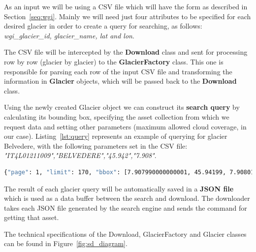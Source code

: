 \documentclass[12pt, a4paper]{report}
\begin{document}
	\par As an input we will be using a CSV file which will have the form as described in Section~\ref{seq:wgi}. Mainly we will need just four attributes to be specified for each desired glacier in order to create a query for searching, as follows: \textit{wgi\_glacier\_id, glacier\_name, lat and lon}.
	
	\par The CSV file will be intercepted by the \textbf{Download } class and sent for processing row by row (glacier by glacier) to the \textbf{GlacierFactory} class. This one is responsible for parsing each row of the input CSV file and transforming the information in \textbf{Glacier} objects, which will be passed back to the \textbf{Download} class.
	
	\par Using the newly created Glacier object we can construct its \textbf{search query} by calculating its bounding box, specifying the asset collection from which we request data and setting other parameters (maximum allowed cloud coverage, in our case). Listing~\ref{lst:query} represents an example of querying for glacier Belvedere, with the following parameters set in the CSV file: \textit{"IT4L01211009","BELVEDERE","45.942","7.908"}.
	
	\begin{lstlisting}[caption={Search query created by sat-search},label={lst:query},language=Bash]
		{"page": 1, "limit": 170, "bbox": [7.907990000000001, 45.94199, 7.90801, 45.94201], "query": {"eo:cloud_cover": {"lt": 10}}, "collection": "landsat-8-l1"}
	\end{lstlisting}

	\par The result of each glacier query will be automatically saved in a \textbf{JSON file} which is used as a data buffer between the search and download. The downloader takes each JSON file generated by the search engine and sends the command for getting that asset.
	
	\par The technical specifications of the Download, GlacierFactory and Glacier classes can be found in Figure~\ref{fig:sd_diagram}.
	
\end{document}
